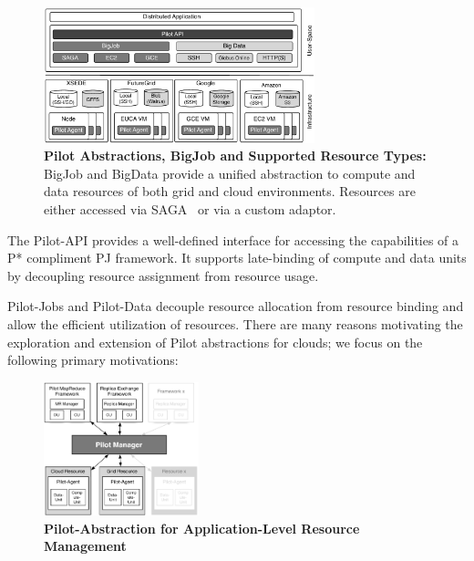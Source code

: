 \documentclass[times]{cpeauth}
\newcommand{\jhanote}[1]{ {\textcolor{red} { ***shantenu: #1 }}}
\newcommand{\jhanote}[1]{}
\newcommand{\pilot}{Pilot\xspace}
\newcommand{\pilotjobs}{Pilot-Jobs\xspace}
\newcommand{\pilotdata}{Pilot-Data\xspace}
\begin{document}
\begin{figure}[t]
	\centering
		\includegraphics[width=0.7\textwidth]{figures/cloud_pilot_job.pdf}
	\caption{\textbf{Pilot Abstractions, BigJob and Supported Resource Types:} 
	BigJob and BigData 
	provide a unified abstraction to compute and data resources of both grid 
	and cloud environments. Resources are either accessed via 
	SAGA~\cite{ogf-gfd-90,saga-bliss-pd} or via a custom adaptor.}
	\label{fig:figures_cloud_pilot_job}
\end{figure}

The \pilot-API provides a well-defined interface for accessing the
capabilities of a P* compliment PJ framework. It supports late-binding of
compute and data units by decoupling resource assignment from resource usage.





\pilotjobs and \pilotdata decouple resource allocation
from resource binding and allow the efficient utilization of
resources.  There are many reasons motivating the exploration and
extension of \pilot abstractions for clouds; we focus on the following
primary motivations:

\begin{figure}
	\centering
		\includegraphics[width=0.4\textwidth]{figures/pilot-abstractions.pdf}
	\caption{\textbf{Pilot-Abstraction for Application-Level Resource Management}}
	\label{fig:figures_pilot-abstractions}
\end{figure}
\end{document}
